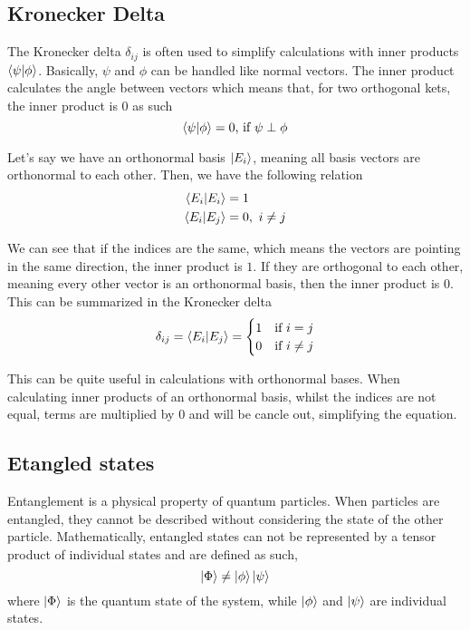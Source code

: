 \subsection{Kronecker Delta}
The Kronecker delta $\delta_{ij}$ is often used to simplify calculations with inner products $\braket{\psi | \phi}$.
Basically, $\psi$ and $\phi$ can be handled like normal vectors. 
The inner product calculates the angle between vectors which means that, for two orthogonal kets, the inner product is $0$ as such
\begin{equation}
\braket{\psi|\phi} = 0 \text{, if } \psi \perp \phi\\
\end{equation}

Let's say we have an orthonormal basis $\ket{E_i}$, meaning all basis vectors are orthonormal to each other.
Then, we have the following relation
\begin{equation}
\begin{split}
\braket{E_i|E_i} &= 1\\
\braket{E_i|E_j} &= 0, \ i\neq j
\end{split}
\end{equation}

We can see that if the indices are the same, which means the vectors are pointing in the same direction, the inner product is $1$.
If they are orthogonal to each other, meaning every other vector is an orthonormal basis, then the inner product is $0$.
This can be summarized in the Kronecker delta
\begin{equation}
    \delta_{ij} = \braket{E_i|E_j} = \begin{cases} 1 & \text{if } i=j\\ 0 & \text{if } i \neq j
\end{cases}
\end{equation}

This can be quite useful in calculations with orthonormal bases.
When calculating inner products of an orthonormal basis, whilst the indices are not equal, terms are multiplied by $0$ and will be cancle out, simplifying the equation.

\subsection{Etangled states}
Entanglement is a physical property of quantum particles. 
When particles are entangled, they cannot be described without considering the state of the other particle.
Mathematically, entangled states can not be represented by a tensor product of individual states and are defined as such,
\begin{equation}
    \ket{\Phi} \neq \ket{\phi} \ket{\psi}
\end{equation}
where $\ket{\Phi}$ is the quantum state of the system, while $\ket \phi$ and  $\ket \psi$ are individual states.

